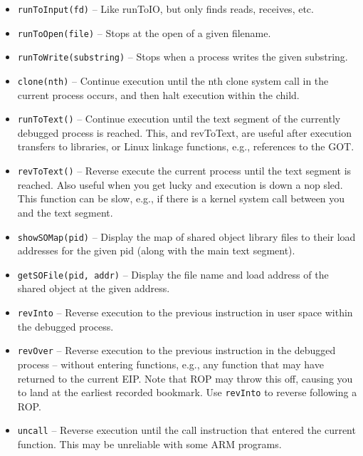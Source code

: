 \documentclass[titlepage]{article}
\begin{document}
\begin{itemize}
\item {\tt runToInput(fd)} -- Like runToIO, but only finds reads, receives, etc.

\item {\tt runToOpen(file)} -- Stops at the open of a given filename.

\item {\tt runToWrite(substring)} -- Stops when a process writes the given substring.

\item {\tt clone(nth)} – Continue execution until the nth clone system call in the current process occurs, and then halt execution within the child.

\item {\tt runToText()} – Continue execution until the text segment of the currently debugged process is reached.  This, and revToText, are useful after execution transfers to libraries, or Linux linkage functions, e.g., references to the GOT.

\item {\tt revToText()} – Reverse execute the current process until the text segment is reached.  Also useful when you get lucky and execution is down a nop sled.  This function can be slow, e.g., if there is a kernel system call between you and the text segment.
 
\item {\tt showSOMap(pid)} – Display the map of shared object library files to their load addresses for the given pid (along with the main text segment).

\item {\tt getSOFile(pid, addr)} – Display the file name and load address of the shared object at the given address.

\item {\tt revInto} – Reverse execution to the previous instruction in user space within the debugged process. 

\item {\tt revOver} – Reverse execution to the previous instruction in the debugged process – without entering functions, e.g., any function that may have returned to the current EIP.  Note that ROP may throw this off, causing you to land at the earliest recorded bookmark.  Use {\tt revInto} to reverse following a ROP.

\item {\tt uncall} – Reverse execution until the call instruction that entered the current function.  This may be unreliable with some ARM
programs.


\end{itemize}
\end{document}
